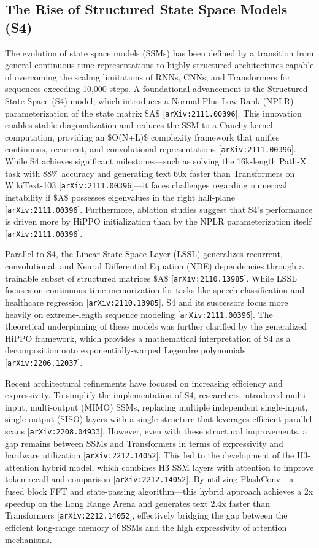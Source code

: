 \documentclass[11pt]{article}
\begin{document}
\subsection{The Rise of Structured State Space Models (S4)}

The evolution of state space models (SSMs) has been defined by a transition from general continuous-time representations to highly structured architectures capable of overcoming the scaling limitations of RNNs, CNNs, and Transformers for sequences exceeding 10,000 steps. A foundational advancement is the Structured State Space (S4) model, which introduces a Normal Plus Low-Rank (NPLR) parameterization of the state matrix \$A\$ [\texttt{arXiv:2111.00396}]. This innovation enables stable diagonalization and reduces the SSM to a Cauchy kernel computation, providing an \$O(N+L)\$ complexity framework that unifies continuous, recurrent, and convolutional representations [\texttt{arXiv:2111.00396}]. While S4 achieves significant milestones—such as solving the 16k-length Path-X task with 88\% accuracy and generating text 60x faster than Transformers on WikiText-103 [\texttt{arXiv:2111.00396}]—it faces challenges regarding numerical instability if \$A\$ possesses eigenvalues in the right half-plane [\texttt{arXiv:2111.00396}]. Furthermore, ablation studies suggest that S4's performance is driven more by HiPPO initialization than by the NPLR parameterization itself [\texttt{arXiv:2111.00396}].

Parallel to S4, the Linear State-Space Layer (LSSL) generalizes recurrent, convolutional, and Neural Differential Equation (NDE) dependencies through a trainable subset of structured matrices \$A\$ [\texttt{arXiv:2110.13985}]. While LSSL focuses on continuous-time memorization for tasks like speech classification and healthcare regression [\texttt{arXiv:2110.13985}], S4 and its successors focus more heavily on extreme-length sequence modeling [\texttt{arXiv:2111.00396}]. The theoretical underpinning of these models was further clarified by the generalized HiPPO framework, which provides a mathematical interpretation of S4 as a decomposition onto exponentially-warped Legendre polynomials [\texttt{arXiv:2206.12037}].

Recent architectural refinements have focused on increasing efficiency and expressivity. To simplify the implementation of S4, researchers introduced multi-input, multi-output (MIMO) SSMs, replacing multiple independent single-input, single-output (SISO) layers with a single structure that leverages efficient parallel scans [\texttt{arXiv:2208.04933}]. However, even with these structural improvements, a gap remains between SSMs and Transformers in terms of expressivity and hardware utilization [\texttt{arXiv:2212.14052}]. This led to the development of the H3-attention hybrid model, which combines H3 SSM layers with attention to improve token recall and comparison [\texttt{arXiv:2212.14052}]. By utilizing FlashConv—a fused block FFT and state-passing algorithm—this hybrid approach achieves a 2x speedup on the Long Range Arena and generates text 2.4x faster than Transformers [\texttt{arXiv:2212.14052}], effectively bridging the gap between the efficient long-range memory of SSMs and the high expressivity of attention mechanisms.
\end{document}
